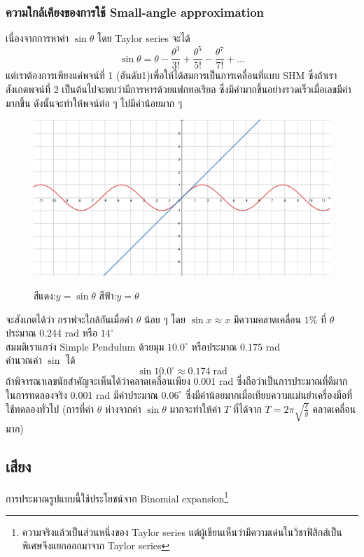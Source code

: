 \documentclass[a4paper,12pt]{article}
\begin{document}
	\subsubsection{ความใกล้เคียงของการใช้ Small-angle approximation}
	เนื่องจากการหาค่า $\sin\theta$ โดย Taylor series จะได้
	\begin{equation}\label{taylor_sinx}
	\sin\theta=\theta-\frac{\theta^3}{3!}+\frac{\theta^5}{5!}-\frac{\theta^7}{7!}+\dots
	\end{equation}
	แต่เราต้องการเพียงแค่พจน์ที่ 1 (อันดับ1)เพื่อให้ได้สมการเป็นการเคลื่อนที่แบบ SHM ซึ่งถ้าเราสังเกตพจน์ที่ 2 เป็นต้นไปจะพบว่ามีการหารด้วยแฟกทอเรียล ซึ่งมีค่ามากขึ้นอย่างรวดเร็วเมื่อเลขมีค่ามากขึ้น ดังนั้นจะทำให้พจน์ต่อ ๆ ไปมีค่าน้อยมาก ๆ\\
	\begin{figure}[h]
		\centering
		\includegraphics[width=0.8\linewidth]{plot_sinx_x}	
		\label{fig:plot1}
		\caption{สีแดง:$y=\sin \theta$ สีฟ้า:$y=\theta$}
	\end{figure}
\linebreak
	จะสังเกตได้ว่า กราฟจะใกล้กันเมื่อค่า $\theta$ น้อย ๆ โดย $\sin x\approx x$ มีความคลาดเคลื่อน $1\%$ ที่ $\theta$ ประมาณ 0.244 rad หรือ $14^\circ$\\
	\indent สมมติเราแกว่ง Simple Pendulum ด้วยมุม $10.0^\circ$ หรือประมาณ $0.175$ rad\\
	คำนวณค่า $\sin$ ได้
	$$\sin10.0^\circ\approx0.174\;\mathrm{rad}$$
	ถ้าพิจารณาเลขนัยสำคัญจะเห็นได้ว่าคลาดเคลื่อนเพียง 0.001 rad ซึ่งถือว่าเป็นการประมาณที่ดีมาก ในการทดลองจริง 0.001 rad มีค่าประมาณ $0.06^\circ$ ซึ่งมีค่าน้อยมากเมื่อเทียบความแม่นยำเครื่องมือที่ใช้ทดลองทั่วไป (การที่ค่า $\theta$ ห่างจากค่า $\sin\theta$ มากจะทำให้ค่า $T$ ที่ได้จาก $T=2\pi\sqrt{\frac{\ell}{g}}$ คลาดเคลื่อนมาก)
	\subsection{เสียง}
	การประมาณรูปแบบนี้ใช้ประโยชน์จาก Binomial expansion\footnote{ความจริงแล้วเป็นส่วนหนึ่งของ Taylor series แต่ผู้เขียนเห็นว่ามีความเด่นในวิชาฟิสิกส์เป็นพิเศษจึงแยกออกมาจาก Taylor series} 
\end{document}
